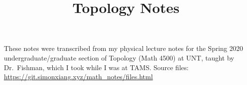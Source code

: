 \documentclass[fontsize=9pt]{article}
\title{Topology Notes}
\date{}
\begin{document}
\maketitle
These notes were transcribed from my physical lecture notes for the Spring 2020 undergraduate/graduate section of Topology (Math 4500) at UNT, taught by Dr.\ Fishman, which I took while I was at TAMS. Source files: \url{https://git.simonxiang.xyz/math_notes/files.html}
\tableofcontents
\newpage
    
\clearpage
\printbibliography
\end{document}
